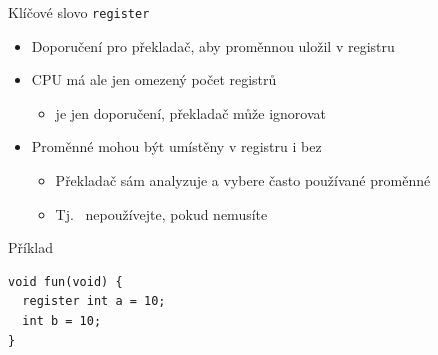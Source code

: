 \begin{frame}[fragile]{Klíčové slovo \texttt{register}}

  \begin{itemize}
    \item Doporučení pro překladač, aby proměnnou uložil v registru

    \pause

    \item CPU má ale jen omezený počet registrů
    \begin{itemize}
      \item {} je jen doporučení, překladač může ignorovat
    \end{itemize}

    \pause

    \item Proměnné mohou být umístěny v registru i bez 
    \begin{itemize}
      \item Překladač sám analyzuje a vybere často používané proměnné
      \item Tj.\  nepoužívejte, pokud nemusíte
    \end{itemize}

  \end{itemize}


\begin{block}{Příklad}
\begin{lstlisting}
void fun(void) {
  register int a = 10;
  int b = 10;
}
\end{lstlisting}
\end{block}

\end{frame}

